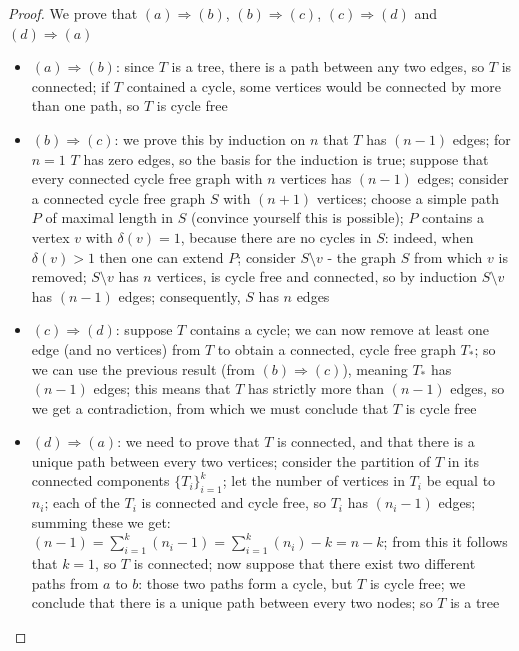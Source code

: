 \begin{proof} We prove that $(a) \Rightarrow (b)$, $(b) \Rightarrow
(c)$, $(c) \Rightarrow (d)$ and $(d) \Rightarrow (a)$
\begin{itemize}
\item $(a) \Rightarrow (b)$: since $T$ is a tree, there is a path
between any two edges, so $T$ is connected; if $T$ contained a
cycle, some vertices would be connected by more than one path, so $T$
is cycle free
\item $(b) \Rightarrow (c)$:
we prove this by induction on $n$ that $T$ has $(n-1)$ edges; for
$n=1$ $T$ has zero edges, so the basis for the induction is true;
suppose that every connected cycle free graph with $n$ vertices has
$(n-1)$ edges; consider a connected cycle free graph $S$ with $(n+1)$
vertices; choose a simple path $P$ of maximal length in $S$
(convince yourself this is possible); $P$ contains a vertex $v$ with
$\delta(v) = 1$, because there are no cycles in $S$: indeed, when
$\delta(v) > 1$ then one can extend $P$; consider $S \setminus v$ -
the graph $S$ from which $v$ is removed; $S \setminus v$ has $n$
vertices, is cycle free and connected, so by induction $S \setminus v$
has $(n-1)$ edges; consequently, $S$ has $n$ edges

\item $(c) \Rightarrow (d)$: suppose $T$ contains a cycle; we can now
remove at least one edge (and no vertices) from $T$ to obtain a
connected, cycle free graph $T_{*}$; so we can use the previous result
(from $(b) \Rightarrow (c)$), meaning $T_{*}$ has $(n-1)$ edges; this
means that $T$ has strictly more than $(n-1)$ edges, so we get a
contradiction, from which we must conclude that $T$ is cycle free

\item $(d) \Rightarrow (a)$:
we need to prove that $T$ is connected, and that there is a unique
path between every two vertices; consider the partition of $T$ in its
connected components $\{T_{i}\}_{i=1}^{k}$; let the number of vertices
in $T_{i}$ be equal to $n_{i}$; each of the $T_{i}$ is connected and
cycle free, so $T_{i}$ has $(n_{i}-1)$ edges; summing these we get:
$(n-1) = \sum_{i=1}^{k} (n_{i}-1) = \sum_{i=1}^{k} (n_{i}) - k = n - k$;
from this it follows that $k=1$, so $T$ is connected; now suppose that
there exist two different paths from $a$ to $b$: those two paths form
a cycle, but $T$ is cycle free; we conclude that there is a unique
path between every two nodes; so $T$ is a tree

\end{itemize}
\end{proof}

